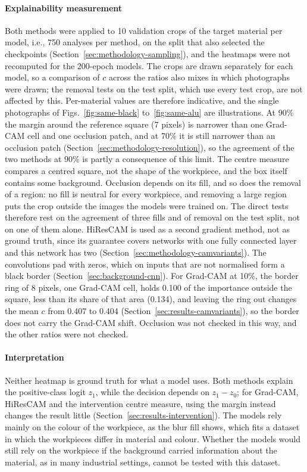 \paragraph{Explainability measurement}
Both methods were applied to 10 validation crops of the target material per model,
i.e., 750 analyses per method, on the split that also selected the checkpoints
(Section~\ref{sec:methodology-sampling}), and the heatmaps were not recomputed for the
200-epoch models. The crops are drawn separately for each model, so a comparison of $c$
across the ratios also mixes in which photographs were drawn; the removal tests on the
test split, which use every test crop, are not affected by this. Per-material values are therefore indicative, and the single
photographs of Figs.~\ref{fig:same-black} to~\ref{fig:same-alu} are illustrations. At
90\% the margin around the reference square (7 pixels) is narrower than one Grad-CAM
cell and one occlusion patch, and at 70\% it is still narrower than an occlusion patch
(Section~\ref{sec:methodology-resolution}), so the agreement of the two methods at 90\%
is partly a consequence of this limit. The centre measure compares a centred square,
not the shape of the workpiece, and the box itself contains some background. Occlusion
depends on its fill, and so does the removal of a region: no fill is neutral for every
workpiece, and removing a large region puts the crop outside the images the models were
trained on. The direct tests therefore rest on the agreement of three fills and of
removal on the test split, not on one of them alone. HiResCAM is used as a second
gradient method, not as ground truth, since its guarantee covers networks with one fully
connected layer and this network has two (Section~\ref{sec:methodology-camvariants}).
The convolutions pad with zeros, which on inputs that are not normalised form a black
border (Section~\ref{sec:background-cnn}). For Grad-CAM at 10\%, the border ring of
8 pixels, one Grad-CAM cell, holds 0.100 of the importance outside the square, less than
its share of that area (0.134), and leaving the ring out changes the mean $c$ from 0.407
to 0.404 (Section~\ref{sec:results-camvariants}), so the border does not carry the
Grad-CAM shift. Occlusion was not checked in this way, and the other ratios were not
checked.

\paragraph{Interpretation}
Neither heatmap is ground truth for what a model uses. Both methods explain the
positive-class logit $z_1$, while the decision depends on $z_1 - z_0$; for Grad-CAM,
HiResCAM and the intervention centre measure, using the margin instead changes the
result little (Section~\ref{sec:results-intervention}). The models rely mainly on the
colour of the workpiece, as the blur fill shows, which fits a dataset in which the
workpieces differ in material and colour. Whether the models would still rely on the
workpiece if the background carried information about the material, as in many
industrial settings, cannot be tested with this dataset.

